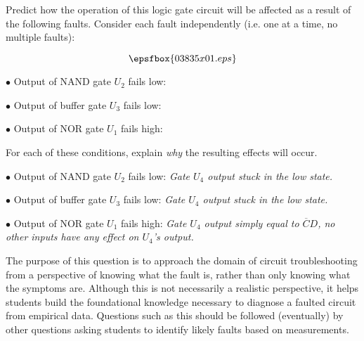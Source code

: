 

Predict how the operation of this logic gate circuit will be affected as a result of the following faults.  Consider each fault independently (i.e. one at a time, no multiple faults):

$$\epsfbox{03835x01.eps}$$

\medskip
\item{$\bullet$} Output of NAND gate $U_2$ fails low:
\vskip 5pt
\item{$\bullet$} Output of buffer gate $U_3$ fails low:
\vskip 5pt
\item{$\bullet$} Output of NOR gate $U_1$ fails high:
\medskip

For each of these conditions, explain {\it why} the resulting effects will occur.







\medskip
\item{$\bullet$} Output of NAND gate $U_2$ fails low: {\it Gate $U_4$ output stuck in the low state.}
\vskip 5pt
\item{$\bullet$} Output of buffer gate $U_3$ fails low: {\it Gate $U_4$ output stuck in the low state.}
\vskip 5pt
\item{$\bullet$} Output of NOR gate $U_1$ fails high: {\it Gate $U_4$ output simply equal to $\overline{C}D$, no other inputs have any effect on $U_4$'s output.}
\medskip







The purpose of this question is to approach the domain of circuit troubleshooting from a perspective of knowing what the fault is, rather than only knowing what the symptoms are.  Although this is not necessarily a realistic perspective, it helps students build the foundational knowledge necessary to diagnose a faulted circuit from empirical data.  Questions such as this should be followed (eventually) by other questions asking students to identify likely faults based on measurements.




